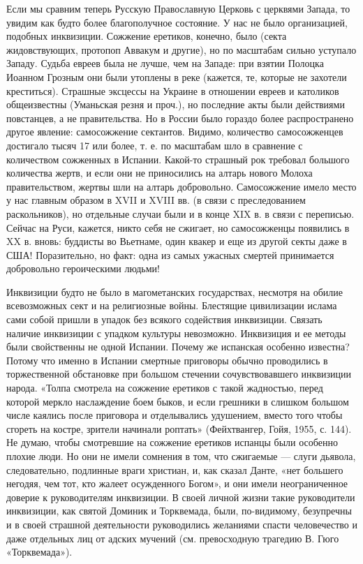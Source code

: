 Если мы сравним теперь Русскую Православную Церковь с церквями Запада,
то  увидим как  будто более  благополучное  состояние. У  нас не  было
организацией,  подобных инквизиции.  Сожжение еретиков,  конечно, было
(секта  жидовствующих, протопоп  Аввакум  и другие),  но по  масштабам
сильно уступало  Западу. Судьба евреев  была не лучше, чем  на Западе:
при взятии Полоцка Иоанном Грозным  они были утоплены в реке (кажется,
те, которые  не захотели креститься).  Страшные эксцессы на  Украине в
отношении евреев  и католиков общеизвестны (Уманьская  резня и проч.),
но последние акты были действиями повстанцев, а не правительства. Но в
России было гораздо более  распространено другое явление: самосожжение
сектантов.  Видимо, количество  самосожженцев достигало  тысяч 17  или
более, т.  е. по масштабам шло  в сравнение с количеством  сожженных в
Испании. Какой-то  страшный рок требовал большого  количества жертв, и
если они не приносились на алтарь нового Молоха правительством, жертвы
шли  на алтарь  добровольно. Самосожжение  имело место  у нас  главным
образом в XVII и XVIII вв. (в связи с преследованием раскольников), но
отдельные случаи были и в конце XIX  в. в связи с переписью. Сейчас на
Руси, кажется, никто  себя не сжигает, но самосожженцы  появились в XX
в. вновь:  буддисты во  Вьетнаме, один  квакер и  еще из  другой секты
даже  в США!  Поразительно, но  факт:  одна из  самых ужасных  смертей
принимается добровольно героическими людьми!

Инквизиции  будто не  было в  магометанских государствах,  несмотря на
обилие всевозможных сект и на религиозные войны. Блестящие цивилизации
ислама сами собой  пришли в упадок без  всякого содействия инквизиции.
Связать наличие инквизиции с упадком культуры невозможно. Инквизиция и
ее  методы были  свойственны  не одной  Испании.  Почему же  испанская
особенно  известна? Потому  что  именно в  Испании смертные  приговоры
обычно  проводились в  торжественной обстановке  при большом  стечении
сочувствовавшего  инквизиции  народа.   «Толпа  смотрела  на  сожжение
еретиков  с такой  жадностью,  перед которой  меркло наслаждение  боем
быков, и если грешники в слишком большом числе каялись после приговора
и отделывались удушением, вместо того чтобы сгореть на костре, зрители
начинали роптать» (Фейхтвангер,  Гойя, 1955, с. 144).  Не думаю, чтобы
смотревшие на сожжение еретиков испанцы  были особенно плохие люди. Но
они  не  имели  сомнения  в  том, что  сжигаемые  ---  слуги  дьявола,
следовательно,  подлинные враги  христиан, и,  как сказал  Данте, «нет
большего негодяя, чем тот, кто  жалеет осужденного Богом», и они имели
неограниченное  доверие к  руководителям  инквизиции.  В своей  личной
жизни такие руководители инквизиции,  как святой Доминик и Торквемада,
были,  по-видимому,   безупречны  и  в  своей   страшной  деятельности
руководились  желаниями спасти  человечество и  даже отдельных  лиц от
адских мучений (см. превосходную трагедию В. Гюго «Торквемада»).

